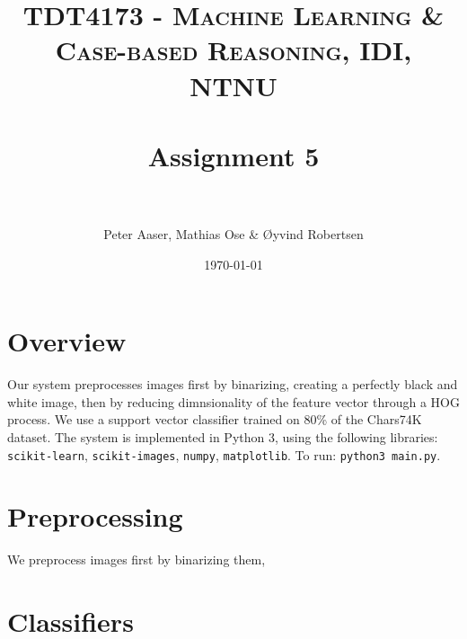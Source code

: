 \documentclass[paper=a4, fontsize=11pt]{scrartcl} %
\title{	
    \normalfont \normalsize 
    \textsc{TDT4173 - Machine Learning \& Case-based Reasoning, IDI, NTNU} \\ [25pt] %
    \horrule{0.5pt} \\[0.4cm] %
    \huge Assignment 5 \\ %
    \horrule{2pt} \\[0.5cm] %
}
\author{Peter Aaser, Mathias Ose \& Øyvind Robertsen} %
\date{\normalsize\today} %
\numberwithin{equation}{section} %
\numberwithin{figure}{section} %
\numberwithin{table}{section} %
\begin{document}
\maketitle %



\section{Overview}

Our system preprocesses images first by binarizing, creating a perfectly black and white image, then by reducing dimnsionality of the feature vector through a HOG process.
We use a support vector classifier trained on 80\% of the Chars74K dataset.
The system is implemented in Python 3, using the following libraries: \texttt{scikit-learn}, \texttt{scikit-images}, \texttt{numpy}, \texttt{matplotlib}.
To run: \texttt{python3 main.py}.

\section{Preprocessing}

We preprocess images first by binarizing them, 



\section{Classifiers}
\end{document}
